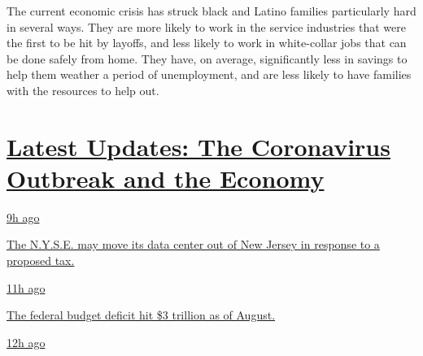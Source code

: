 The current economic crisis has struck black and Latino families
particularly hard in several ways. They are more likely to work in the
service industries that were the first to be hit by layoffs, and less
likely to work in white-collar jobs that can be done safely from home.
They have, on average, significantly less in savings to help them
weather a period of unemployment, and are less likely to have families
with the resources to help out.

\hypertarget{latest-updates-the-coronavirus-outbreak-and-the-economy}{%
\section{\texorpdfstring{\href{https://www.nytimes3xbfgragh.onion/live/2020/09/11/business/stock-market-today-coronavirus?action=click\&pgtype=Article\&state=default\&region=MAIN_CONTENT_1\&context=storylines_live_updates}{Latest
Updates: The Coronavirus Outbreak and the
Economy}}{Latest Updates: The Coronavirus Outbreak and the Economy}}\label{latest-updates-the-coronavirus-outbreak-and-the-economy}}

\href{https://www.nytimes3xbfgragh.onion/live/2020/09/11/business/stock-market-today-coronavirus?action=click\&pgtype=Article\&state=default\&region=MAIN_CONTENT_1\&context=storylines_live_updates\#the-nyse-may-move-its-data-center-out-of-new-jersey-in-response-to-a-proposed-tax}{9h
ago}

\href{https://www.nytimes3xbfgragh.onion/live/2020/09/11/business/stock-market-today-coronavirus?action=click\&pgtype=Article\&state=default\&region=MAIN_CONTENT_1\&context=storylines_live_updates\#the-nyse-may-move-its-data-center-out-of-new-jersey-in-response-to-a-proposed-tax}{The
N.Y.S.E. may move its data center out of New Jersey in response to a
proposed tax.}

\href{https://www.nytimes3xbfgragh.onion/live/2020/09/11/business/stock-market-today-coronavirus?action=click\&pgtype=Article\&state=default\&region=MAIN_CONTENT_1\&context=storylines_live_updates\#the-federal-budget-deficit-hit-3-trillion-as-of-august}{11h
ago}

\href{https://www.nytimes3xbfgragh.onion/live/2020/09/11/business/stock-market-today-coronavirus?action=click\&pgtype=Article\&state=default\&region=MAIN_CONTENT_1\&context=storylines_live_updates\#the-federal-budget-deficit-hit-3-trillion-as-of-august}{The
federal budget deficit hit \$3 trillion as of August.}

\href{https://www.nytimes3xbfgragh.onion/live/2020/09/11/business/stock-market-today-coronavirus?action=click\&pgtype=Article\&state=default\&region=MAIN_CONTENT_1\&context=storylines_live_updates\#warner-bros-pushes-the-release-of-wonder-woman-1984-to-christmas}{12h
ago}

